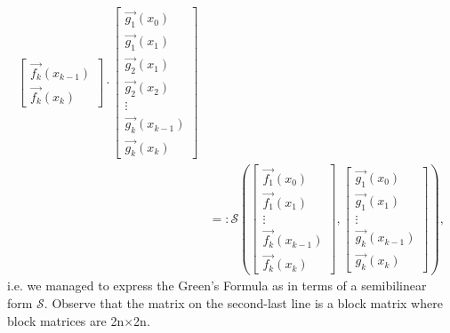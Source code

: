 \documentclass[11pt,reqno,oneside,a4paper]{article}
\theoremstyle{plain} %
\theoremstyle{definition}
\theoremstyle{remark}
\begin{document}
\begin{equation*}
\begin{aligned}
\begin{bmatrix}
\vec{f_k}(x_{k-1})  \\
\vec{f_k}(x_k)
\end{bmatrix}
\cdot 
\begin{bmatrix}
\vec{g_1}(x_{0})  \\
\vec{g_1}(x_1) \\
\vec{g_2}(x_1)  \\
\vec{g_2}(x_2) \\
\vdots \\
\vec{g_k}(x_{k-1})  \\
\vec{g_k}(x_k)
\end{bmatrix} \\
&=: \mathcal{S} \left( \begin{bmatrix}
\vec{f_1}(x_{0})  \\
\vec{f_1}(x_1) \\
\vdots \\
\vec{f_k}(x_{k-1})  \\
\vec{f_k}(x_k)
\end{bmatrix},  
\begin{bmatrix}
\vec{g_1}(x_{0})  \\
\vec{g_1}(x_1) \\
\vdots \\
\vec{g_k}(x_{k-1})  \\
\vec{g_k}(x_k)
\end{bmatrix}
\right),
\end{aligned}
\end{equation*}
i.e. we managed to express the Green's Formula as in terms of a semibilinear form $\mathcal{S}.$ Observe that the matrix on the second-last line is a block matrix where block matrices are 2n$\times$2n.
\end{document}
